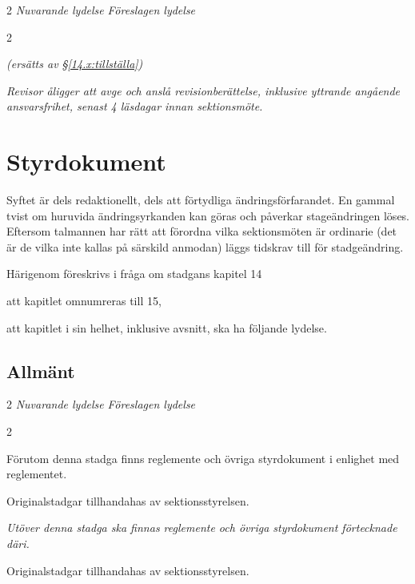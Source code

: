 \documentclass{article}
\newenvironment{lydelse}
    {\begin{paracol}{2}%
        \emph{Nuvarande lydelse}%
        \switchcolumn%
        \emph{Föreslagen lydelse}%
    \end{paracol}%
    \begin{enumerate}[label=\thesubsection.\arabic*]%
    \begin{paracol}{2}%
    }{\end{paracol}\end{enumerate}}
\begin{document}
\begin{lydelse}
  \switchcolumn
  \item[] \emph{(ersätts av \S\ref{14.x:tillställa})}
 
  \item \emph{Revisor åligger att avge och anslå revisionberättelse, inklusive yttrande angående ansvarsfrihet, senast 4 läsdagar innan sektionsmöte.}

\end{lydelse}
\setcounter{section}{14}
\setcounter{subsection}{2}
\setcounter{enumi}{0}

\section{Styrdokument}
Syftet är dels redaktionellt, dels att förtydliga ändringsförfarandet.
En gammal tvist om huruvida ändringsyrkanden kan göras och påverkar stageändringen löses.
Eftersom talmannen har rätt att förordna vilka sektionsmöten är ordinarie (det är de vilka inte kallas på särskild anmodan) läggs tidskrav till för stadgeändring.

Härigenom föreskrivs i fråga om stadgans kapitel 14
\begin{dels}
  \item att kapitlet omnumreras till 15,
  \item att kapitlet i sin helhet, inklusive avsnitt, ska ha följande lydelse.
\end{dels}

\subsection{Allmänt}
\begin{lydelse}
  \setcounter{section}{14}
  \setcounter{subsection}{1}
  \item Förutom denna stadga finns reglemente och övriga styrdokument i enlighet med reglementet.
  \setcounter{subsection}{6}
  \setcounter{enumi}{0}  
  \item Originalstadgar tillhandahas av sektionsstyrelsen.
  \switchcolumn
  \setcounter{subsection}{1}
  \item \emph{Utöver denna stadga ska finnas reglemente och övriga styrdokument förtecknade däri.}
  \item Originalstadgar tillhandahas av sektionsstyrelsen.
\end{lydelse}
\setcounter{section}{15}
\setcounter{subsection}{1}
\end{document}
